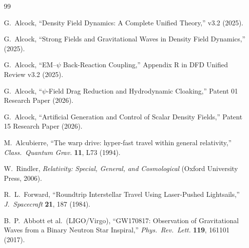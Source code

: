 \documentclass[aps,prd,twocolumn,superscriptaddress,nofootinbib]{revtex4-2}
\begin{document}
\begin{thebibliography}{99}

G.~Alcock, ``Density Field Dynamics: A Complete Unified Theory,''
v3.2 (2025).

G.~Alcock, ``Strong Fields and Gravitational Waves in Density
Field Dynamics,'' (2025).

G.~Alcock, ``EM--$\psi$ Back-Reaction Coupling,'' Appendix R
in DFD Unified Review v3.2 (2025).

G.~Alcock, ``$\psi$-Field Drag Reduction and Hydrodynamic Cloaking,''
Patent 01 Research Paper (2026).

G.~Alcock, ``Artificial Generation and Control of Scalar Density
Fields,'' Patent 15 Research Paper (2026).

M.~Alcubierre, ``The warp drive: hyper-fast travel within general
relativity,'' \textit{Class.\ Quantum Grav.} \textbf{11}, L73 (1994).

W.~Rindler, \textit{Relativity: Special, General, and Cosmological}
(Oxford University Press, 2006).

R.~L.~Forward, ``Roundtrip Interstellar Travel Using Laser-Pushed
Lightsails,'' \textit{J.\ Spacecraft} \textbf{21}, 187 (1984).

B.~P.~Abbott et al.\ (LIGO/Virgo), ``GW170817: Observation of
Gravitational Waves from a Binary Neutron Star Inspiral,''
\textit{Phys.\ Rev.\ Lett.} \textbf{119}, 161101 (2017).

\end{thebibliography}
\end{document}
